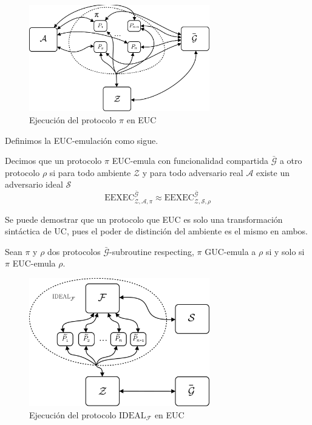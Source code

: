 \begin{figure}[hp]
    \centering
    \includegraphics[width=0.7\textwidth]{figs/mundo_real_euc}
    \caption{Ejecución del protocolo $\pi$ en EUC}
    \label{fig:mundo_real_euc}
\end{figure}

Definimos la EUC-emulación como sigue.

\begin{definicion}
Decimos que un protocolo $\pi$ EUC-emula con funcionalidad compartida $\bar{\mathcal{G}}$ a otro protocolo
$\rho$ si para todo ambiente $\mathcal{Z}$ y para todo adversario real $\mathcal{A}$ existe un adversario
ideal $\mathcal{S}$
$$\mathrm{EEXEC}_{\mathcal{Z}, \mathcal{A}, \mathcal{\pi}}^{\bar{\mathcal{G}}}
\approx
\mathrm{EEXEC}_{\mathcal{Z}, \mathcal{S}, \mathcal{\rho}}^{\bar{\mathcal{G}}}$$
\end{definicion}

Se puede demostrar que un protocolo que EUC es solo una transformación sintáctica de UC, pues el poder
de distinción del ambiente es el mismo en ambos.

\begin{teorema}
Sean $\pi$ y $\rho$ dos protocolos $\bar{\mathcal{G}}$-subroutine respecting, $\pi$ GUC-emula a
$\rho$ si y solo si $\pi$ EUC-emula $\rho$.
\end{teorema}

\begin{figure}[hp]
    \centering
    \includegraphics[width=0.7\textwidth]{figs/mundo_ideal_guc}
    \caption{Ejecución del protocolo $\textrm{IDEAL}_\mathcal{F}$ en EUC}
    \label{fig:mundo_real_euc}
\end{figure}

